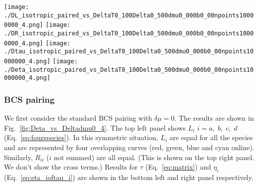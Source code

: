 \documentclass[10pt, aps, prd, superscriptaddress, nofootinbib, 
               amsmath, amssymb, twocolumn,
               preprintnumbers, showpacs,
               raggedbottom,
               floatfix]{revtex4-1}
\newcommand{\calM}{{\cal{M}}}
\newcommand{\un}{{\rm{un}}}
\begin{document}
\begin{figure*}[tbp]
\texttt{[image: ./DL\_isotropic\_paired\_vs\_DeltaT0\_100Delta0\_500dmu0\_000b0\_00npoints10000000\_4.png]}
\texttt{[image: ./DR\_isotropic\_paired\_vs\_DeltaT0\_100Delta0\_500dmu0\_000b0\_00npoints10000000\_4.png]}
\texttt{[image: ./Dtau\_isotropic\_paired\_vs\_DeltaT0\_100Delta0\_500dmu0\_000b0\_00npoints10000000\_4.png]}
\texttt{[image: ./Deta\_isotropic\_paired\_vs\_DeltaT0\_100Delta0\_500dmu0\_000b0\_00npoints10000000\_4.png]}
  \caption{(color online) Plots of $L_i$, the diagonal entries of $R$, $\eta_i$
  and $\tau_i$ (anticlockwise from top left) for $|\bar{\calM}|^2$ given in
  Eq.~\ref{eq:M2_8}. The overall scale is set by
  $\mu$. Keeping $T/\mu=3.34\times10^{-4}$ fixed and $\delta\mu=0$,  we plot
  these as a function of $\Delta/T$ for the ``four species'' $i=$, $a$, $b$,
  $c$, and $d$ (Eq.~\ref{eq:fourspecies}). The four solid curves [red ($a$),
  green ($b$), blue ($c$), and cyan ($d$) online which are indistinguishable in
  the plots] denote the results for the four species.  The dotted curves (not
  visibly distinguishable in the plots) signify the errors in the numerical
  integration for $R$ (Eq.~\ref{eq:RSphericalSimplified}).  The dashed
  horizontal curves (green online) are proportional to values for unpaired
  quarks (see text). The dot dashed curves (yellow online) show an exponential
  fall off, $\propto\exp(-\Delta/T)$, for $L_i$ (Eq.~\ref{eq:LDelta}), an exponential
  fall off, $\propto\exp(-2\Delta/T)$, for $R_{ii}$ (Eq.~\ref{eq:R2Delta}), and an exponential
  increase, $\propto\exp(\Delta/T)$, for $\tau_{i}$. The horizontal dashed line for $L$ [$R$, $\tau$,
  $\eta$] corresponds to $L^\un/2$ (Eq.~\ref{eq:Liunpaired}) [$R_{11}^\un$
  (Eq.~\ref{eq:RijunpairedDv2}), $\tau_1^\un$ and
  $\eta_1^\un/2$ (Eq.~\ref{eq:etaunpairedD})].
  ~\label{fig:Deta_vs_Deltadmu0_4}
}
\end{figure*}

\subsubsection{BCS pairing}
\label{subsubsec:dmuzero}
We first consider the standard BCS pairing with $\delta\mu=0$. The results are
shown in Fig.~\ref{fig:Deta_vs_Deltadmu0_4}. The top left panel shows $L_i$
$i=a,\;b,\;c,\;d$ (Eq.~\ref{eq:fourspecies}). In this symmetric situation,
$L_i$ are equal for all the species and are represented by four overlapping
curves (red, green, blue and cyan online). Similarly, $R_{ii}$ ($i$ not summed)
are all equal. (This is shown on the top right panel. We don't show the cross
terms.) Results for $\tau$ (Eq.~\ref{eq:matrix}) and $\eta_i$
(Eq.~\ref{eq:eta_ioftau_i}) are shown in the bottom left and right panel
respectively.
\end{document}
